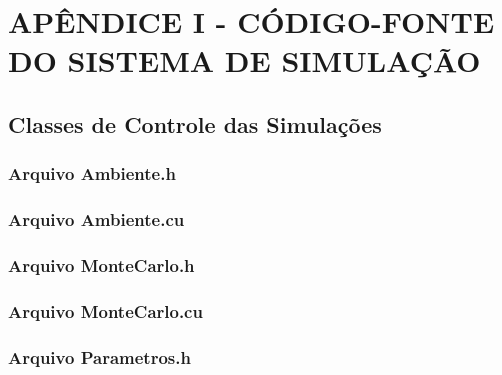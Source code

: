 \section{APÊNDICE I - CÓDIGO-FONTE DO SISTEMA DE SIMULAÇÃO}

\subsection{Classes de Controle das Simulações}

\subsubsection{Arquivo Ambiente.h}



\newpage

\subsubsection{Arquivo Ambiente.cu}



\newpage

\subsubsection{Arquivo MonteCarlo.h}



\newpage

\subsubsection{Arquivo MonteCarlo.cu}



\newpage

\subsubsection{Arquivo Parametros.h}



